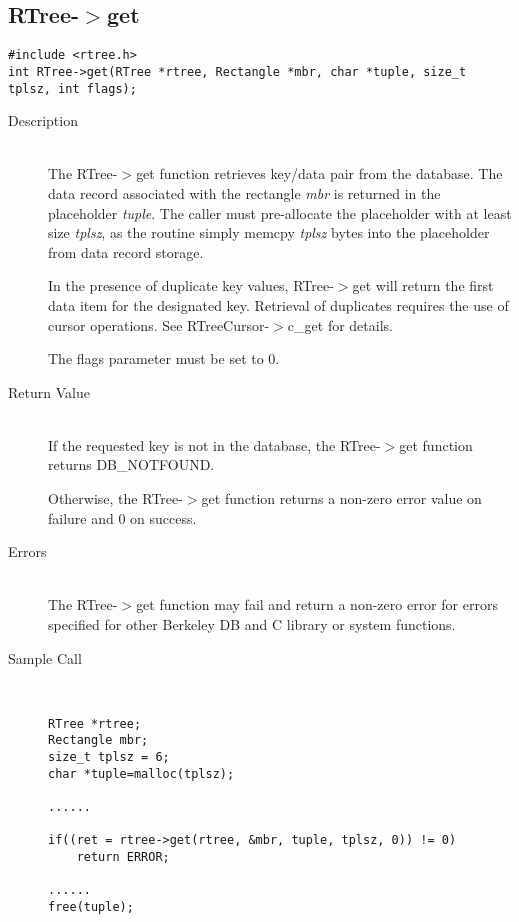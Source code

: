 \documentclass[12pt]{article}
\def\cdf{\sf }
\def\cdf{\sf }
\newcommand{\RTREE}{{\small{\cdf RTree}}}
\newcommand{\RTreeCursor}{{\small{\cdf RTreeCursor}}}
\newcommand{\DBNOTFOUND}{{\small{\cdf DB\_NOTFOUND}}}
\begin{document}
\subsection{{\RTREE}-$>$get}
\begin{verbatim}
#include <rtree.h>
int RTree->get(RTree *rtree, Rectangle *mbr, char *tuple, size_t tplsz, int flags);
\end{verbatim}
\begin{description}
\item[Description]\ \\
  The {\RTREE}-$>$get function retrieves key/data pair from the
  database.  The data record associated with the rectangle {\em
  mbr} is returned in the placeholder {\em tuple}.   The caller
  must pre-allocate the placeholder with at least size {\em
  tplsz}, as the routine simply memcpy {\em tplsz} bytes into the
  placeholder from data record storage.

  In the presence of duplicate key values, {\RTREE}-$>$get will return the
  first data item for the designated key.  Retrieval of duplicates
  requires the use of cursor operations. See
  {\RTreeCursor}-$>$c\_get for details.

  The flags parameter must be set to 0.
  
\item[Return Value]\ \\
  If the requested key is not in the database, the {\RTREE}-$>$get
  function returns {\DBNOTFOUND}.

  Otherwise, the {\RTREE}-$>$get function returns a non-zero error
  value on failure and 0 on success. 

\item[Errors]\ \\
  The {\RTREE}-$>$get function may fail and return a non-zero error
  for errors specified for other Berkeley DB and C library or system
  functions.

\item[Sample Call]\ 
\begin{verbatim}
RTree *rtree;
Rectangle mbr;
size_t tplsz = 6;
char *tuple=malloc(tplsz);

......

if((ret = rtree->get(rtree, &mbr, tuple, tplsz, 0)) != 0)
    return ERROR;

......
free(tuple);
\end{verbatim}
\end{description}

\newpage
\end{document}
